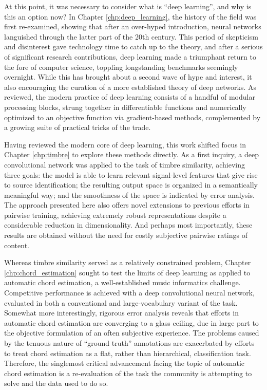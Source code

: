 At this point, it was necessary to consider what is ``deep learning'', and why is this an option now?
In Chapter \ref{chp:deep_learning}, the history of the field was first re-examined, showing that after an over-hyped introduction, neural networks languished through the latter part of the 20th century.
This period of skepticism and disinterest gave technology time to catch up to the theory, and after a serious of significant research contributions, deep learning made a triumphant return to the fore of computer science, toppling longstanding benchmarks seemingly overnight.
While this has brought about a second wave of hype and interest, it also encouraging the curation of a more established theory of deep networks.
As reviewed, the modern practice of deep learning consists of a handful of modular processing blocks, strung together in differentiable functions and numerically optimized to an objective function via gradient-based methods, complemented by a growing suite of practical tricks of the trade.

Having reviewed the modern core of deep learning, this work shifted focus in Chapter \ref{chp:timbre} to explore these methods directly.
As a first inquiry, a deep convolutional network was applied to the task of timbre similarity, achieving three goals:
the model is able to learn relevant signal-level features that give rise to source identification;
the resulting output space is organized in a semantically meaningful way;
and the smoothness of the space is indicated by error analysis.
The approach presented here also offers novel extensions to previous efforts in pairwise training, achieving extremely robust representations despite a considerable reduction in dimensionality.
And perhaps most importantly, these results are obtained without the need for costly subjective pairwise ratings of content.

Whereas timbre similarity served as a relatively constrained problem, Chapter \ref{chp:chord_estimation} sought to test the limits of deep learning as applied to automatic chord estimation, a well-established music informatics challenge.
Competitive performance is achieved with a deep convolutional neural network, evaluated in both a conventional and large-vocabulary variant of the task.
Somewhat more interestingly, rigorous error analysis reveals that efforts in automatic chord estimation are converging to a glass ceiling, due in large part to the objective formulation of an often subjective experience.
The problems caused by the tenuous nature of ``ground truth'' annotations are exacerbated by efforts to treat chord estimation as a flat, rather than hierarchical, classification task.
Therefore, the singlemost critical advancement facing the topic of automatic chord estimation is a re-evaluation of the task the community is attempting to solve and the data used to do so.

